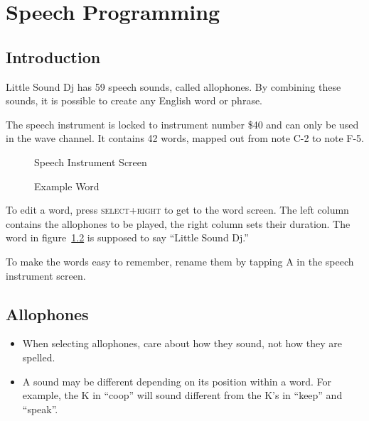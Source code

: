 \chapter{Speech Programming}
\label{speech-chapter}

\section{Introduction}

Little Sound Dj has 59 speech sounds, called allophones. By combining these sounds, it is possible to create any English word or phrase.

The speech instrument is locked to instrument number \$40 and can only be used in the wave channel. It contains 42 words, mapped out from note C-2 to note F-5.

\begin{figure}[htpb]
	\begin{center}
	\end{center}
	\caption{Speech Instrument Screen}
	\label{fig:speech}
\end{figure}
\begin{figure}[htpb]
	\begin{center}
	\end{center}
	\caption{Example Word}
	\label{fig:word}
\end{figure}

To edit a word, press \textsc{select+right} to get to the word screen. The left column contains the allophones to be played, the right column sets their duration. The word in figure~\ref{fig:word} is supposed to say ``Little Sound Dj.''

To make the words easy to remember, rename them by tapping A in the speech instrument screen.

\section{Allophones}

\begin{itemize}
\item When selecting allophones, care about how they sound, not how they are spelled.
\item A sound may be different depending on its position within a word. For example, the K in ``coop'' will sound different from the K's in ``keep'' and ``speak''.
\end{itemize}

